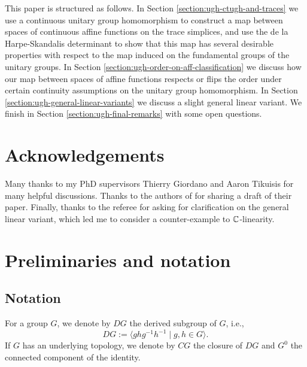 \documentclass[12pt]{amsart}
\begin{document}
This paper is structured as follows. In Section \ref{section:ugh-ctugh-and-traces} we use a continuous unitary group homomorphism to construct a map between spaces of continuous affine functions on the trace simplices, and use the de la Harpe-Skandalis determinant to show that this map has several desirable properties with respect to the map induced on the fundamental groups of the unitary groups. In Section \ref{section:ugh-order-on-aff-classification} we discuss how our map between spaces of affine functions respects or flips the order under certain continuity assumptions on the unitary group homomorphism. In Section \ref{section:ugh-general-linear-variants} we discuss a slight general linear variant. We finish in Section \ref{section:ugh-final-remarks} with some open questions.

  \section*{Acknowledgements}
  Many thanks to my PhD supervisors Thierry Giordano and Aaron Tikuisis for many helpful discussions. Thanks to the authors of \cite{CGSTW23} for sharing a draft of their paper. Finally, thanks to the referee for asking for clarification on the general linear variant, which led me to consider a counter-example to $\mathbb{C}$-linearity. 


\renewcommand*{\thetheorem}{\arabic{section}.\arabic{theorem}}


\section{Preliminaries and notation}

\subsection{Notation} 
For a group $G$, we denote by $DG$ the derived subgroup of $G$, i.e.,
\begin{equation} DG := \langle ghg^{-1}h^{-1} \mid g,h \in G \rangle. \end{equation}
If $G$ has an underlying topology, we denote by $CG$ the closure of $DG$ and $G^0$ the connected component of the identity. 
\end{document}
